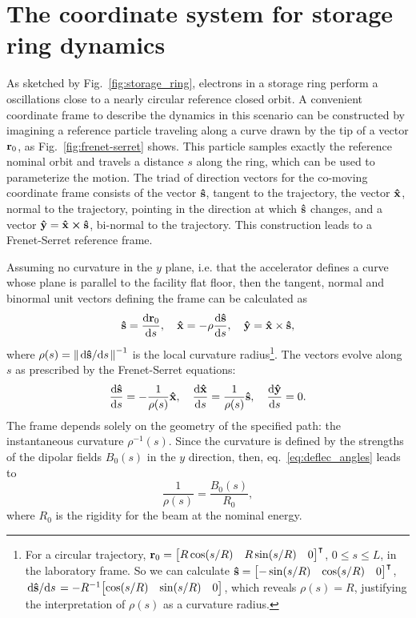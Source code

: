 \section{The coordinate system for storage ring dynamics}
As sketched by Fig.~\ref{fig:storage_ring}, electrons in a storage ring perform a oscillations close to a nearly circular reference closed orbit. A convenient coordinate frame to describe the dynamics in this scenario can be constructed by imagining a reference particle traveling along a curve drawn by the tip of a vector $\vb{r}_0$, as Fig.~\ref{fig:frenet-serret} shows. This particle samples exactly the reference nominal orbit and travels a distance $s$ along the ring, which can be used to parameterize the motion. The triad of direction vectors for the co-moving coordinate frame consists of the vector $\vu{s}$, tangent to the trajectory, the vector $\vu{x}$, normal to the trajectory, pointing in the direction at which $\vu{s}$ changes, and a vector $\vu{y}=\vu{x}\cross\vu{s}$, bi-normal to the trajectory. This construction leads to a Frenet-Serret reference frame.

Assuming no curvature in the $y$ plane, i.e. that the accelerator defines a curve whose plane is parallel to the facility flat floor, then the tangent, normal and binormal unit vectors defining the frame can be calculated as \cite{lee_accelerator_2004}
\begin{equation}
\vu{s}=\dv{\vb{r}_{0}}{s}, \quad \vu{x}=-\rho\dv{\vu{s}}{s}, \quad \vu{y} =  \vu{x}\times\vu{s},
\end{equation}
where $\rho(s) = \norm{\dv*{\vu{s}}{s}}^{-1}$ is the local curvature radius\footnote{For a circular trajectory, $\vb{r}_0 = \mqty[R\cos(s/R) & R\sin(s/R) & 0]^\intercal$, $ 0\leq s \leq L$, in the laboratory frame. So we can calculate $\vu{s}=\mqty[-\sin(s/R) & \cos(s/R) & 0]^\intercal$, $\dv*{\vu{s}}{s} = -R^{-1}\mqty[\cos(s/R) & \sin(s/R) & 0]$, which reveals $\rho(s)=R$, justifying the interpretation of $\rho(s)$ as a curvature radius.}. The vectors evolve along $s$ as prescribed by the Frenet-Serret equations:
\begin{equation}
\dv{\vu{s}}{s}=-\frac{1}{\rho(s)}\vu{x}, \quad\dv{\vu{x}}{s}=\frac{1}{\rho(s)}\vu{s}, \quad \dv{\vu{y}}{s}=0.
\end{equation}
The frame depends solely on the geometry of the specified path: the instantaneous curvature $\rho^{-1}(s)$. Since the curvature is defined by the strengths of the dipolar fields $B_0(s)$ in the $y$ direction, then, eq.~\eqref{eq:deflec_angles} leads to
    \begin{equation}
        \frac{1}{\rho(s)} = \frac{B_0(s)}{R_0},
        \label{eq:G}
    \end{equation}
where $R_0$ is the rigidity for the beam at the nominal energy.

